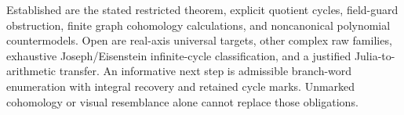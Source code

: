 \documentclass[11pt,letterpaper]{article}
\begin{document}
Established are the stated restricted theorem, explicit quotient cycles, field-guard obstruction, finite graph cohomology calculations, and noncanonical polynomial countermodels. Open are real-axis universal targets, other complex raw families, exhaustive Joseph/Eisenstein infinite-cycle classification, and a justified Julia-to-arithmetic transfer. An informative next step is admissible branch-word enumeration with integral recovery and retained cycle marks. Unmarked cohomology or visual resemblance alone cannot replace those obligations.



\end{document}
